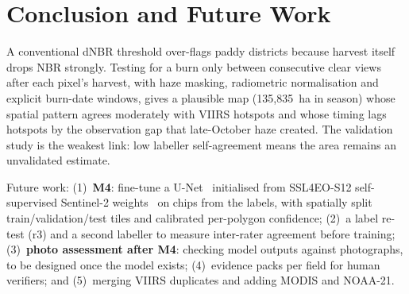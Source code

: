 \documentclass[conference]{IEEEtran}
\begin{document}
\section{Conclusion and Future Work}
A conventional dNBR threshold over-flags paddy districts because harvest itself drops NBR
strongly. Testing for a burn only between consecutive clear views after each pixel's harvest, with
haze masking, radiometric normalisation and explicit burn-date windows, gives a plausible map
(135{,}835~ha in season) whose spatial pattern agrees moderately with VIIRS hotspots and whose
timing lags hotspots by the observation gap that late-October haze created. The validation study is
the weakest link: low labeller self-agreement means the area remains an unvalidated estimate.

Future work: (1)~\textbf{M4}: fine-tune a U-Net~\cite{ronneberger2015} initialised from
SSL4EO-S12 self-supervised Sentinel-2 weights~\cite{wang2023} on chips from the labels, with
spatially split train/validation/test tiles and calibrated per-polygon confidence; (2)~a label
re-test (r3) and a second labeller to measure inter-rater agreement before training; (3)~\textbf{photo
assessment after M4}: checking model outputs against photographs, to be designed once the model
exists; (4)~evidence packs per field for human verifiers; and (5)~merging
VIIRS duplicates and adding MODIS and NOAA-21.
\end{document}
